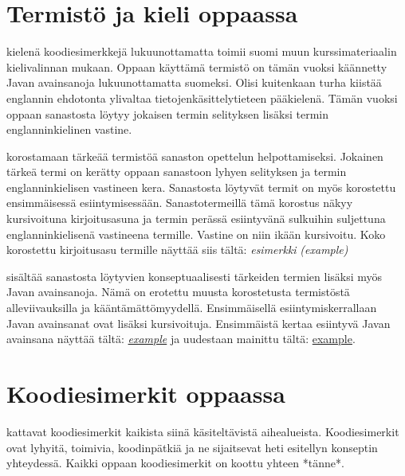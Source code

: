 \documentclass{tufte-book}
\newcommand{\eng}[1]{\textit{(#1)}}
\newcommand{\newnogls}[1]{\textit{#1}}
\newcommand{\newengnogls}[2]{\newnogls{#1} \eng{#2}}
\newcommand{\javanogls}[1]{\underline{#1}}
\newcommand{\newjavanogls}[1]{\textit{\javanogls{#1}}}
\begin{document}

\section{Termistö ja kieli oppaassa}

 kielenä koodiesimerkkejä lukuunottamatta toimii suomi muun
kurssimateriaalin kielivalinnan mukaan. Oppaan käyttämä termistö on tämän vuoksi käännetty Javan
avainsanoja lukuunottamatta suomeksi. Olisi kuitenkaan turha kiistää englannin ehdotonta ylivaltaa
tietojenkäsittelytieteen pääkielenä. Tämän vuoksi oppaan sanastosta löytyy jokaisen termin
selityksen lisäksi termin englanninkielinen vastine.

 korostamaan tärkeää termistöä sanaston opettelun helpottamiseksi.
Jokainen tärkeä termi on kerätty oppaan sanastoon lyhyen selityksen ja termin englanninkielisen
vastineen kera. Sanastosta löytyvät termit on myös korostettu ensimmäisessä esiintymisessään.
Sanastotermeillä tämä korostus näkyy kursivoituna kirjoitusasuna ja termin perässä esiintyvänä
sulkuihin suljettuna englanninkielisenä vastineena termille. Vastine on niin ikään kursivoitu.
Koko korostettu kirjoitusasu termille näyttää siis tältä: \newengnogls{esimerkki}{example}

 sisältää sanastosta löytyvien konseptuaalisesti tärkeiden termien
lisäksi myös Javan avainsanoja. Nämä on erotettu muusta korostetusta termistöstä alleviivauksilla
ja kääntämättömyydellä. Ensimmäisellä esiintymiskerrallaan Javan avainsanat ovat lisäksi
kursivoituja. Ensimmäistä kertaa esiintyvä Javan avainsana näyttää tältä: \newjavanogls{example}
ja uudestaan mainittu tältä: \javanogls{example}.


\section{Koodiesimerkit oppaassa}

 kattavat koodiesimerkit kaikista siinä käsiteltävistä aihealueista.
Koodiesimerkit ovat lyhyitä, toimivia, koodinpätkiä ja ne sijaitsevat heti esitellyn konseptin
yhteydessä. Kaikki oppaan koodiesimerkit on koottu yhteen *tänne*. %
\end{document}
